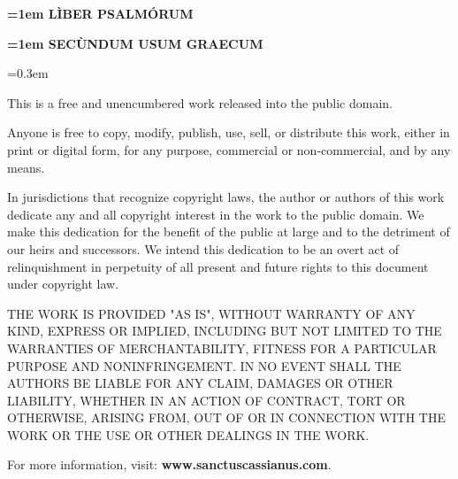 \documentclass[twoside,11pt]{article}
\begin{document}
\pagestyle{empty}
{
  \begin{center}

  \vspace*{15em}

  {\bfseries\Huge{}\font=1em \uppercase{lìber psalmórum}}

  \vspace*{5em}

  {\bfseries\Large{}\font=1em \uppercase{secùndum usum graecum}}

  \vfill

  \end{center}
}

\newpage

{

\vspace*{5em}\font=0.3em

\noindent This is a free and unencumbered work released into the public domain.

\medskip

\noindent Anyone is free to copy, modify, publish, use, sell, or distribute this work, either in print or digital form, for any purpose, commercial or non-commercial, and by any means.

\medskip

\noindent In jurisdictions that recognize copyright laws, the author or authors of this work dedicate any and all copyright interest in the work to the public domain. We make this dedication for the benefit of the public at large and to the detriment of our heirs and successors. We intend this dedication to be an overt act of relinquishment in perpetuity of all present and future rights to this document under copyright law.

\medskip

\noindent THE WORK IS PROVIDED "AS IS", WITHOUT WARRANTY OF ANY KIND, EXPRESS OR IMPLIED, INCLUDING BUT NOT LIMITED TO THE WARRANTIES OF MERCHANTABILITY, FITNESS FOR A PARTICULAR PURPOSE AND NONINFRINGEMENT. IN NO EVENT SHALL THE AUTHORS BE LIABLE FOR ANY CLAIM, DAMAGES OR OTHER LIABILITY, WHETHER IN AN ACTION OF CONTRACT, TORT OR OTHERWISE, ARISING FROM, OUT OF OR IN CONNECTION WITH THE WORK OR THE USE OR OTHER DEALINGS IN THE WORK.

\bigskip

\noindent For more information, visit: \hspace{\parindent} {\bfseries www.sanctuscassianus.com}.

\vfill

}
\end{document}
